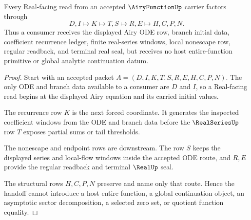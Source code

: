 \begin{theorem}
\label{thm:airy-function-real-series-handoff}
Every Real-facing read from an accepted $\AiryFunctionUp$ carrier factors through
$$
D,I \longmapsto K \longmapsto T,S \longmapsto R,E \longmapsto H,C,P,N .
$$
Thus a consumer receives the displayed Airy ODE row, branch initial data, coefficient recurrence ledger, finite real-series windows, local nonescape row, regular readback, and terminal real seal, but receives no host entire-function primitive or global analytic continuation datum.
\end{theorem}
\begin{proof}
Start with an accepted packet $A=(D,I,K,T,S,R,E,H,C,P,N)$. The only ODE and branch data available to a consumer are $D$ and $I$, so a Real-facing read begins at the displayed Airy equation and its carried initial values.

The recurrence row $K$ is the next forced coordinate. It generates the inspected coefficient windows from the ODE and branch data before the $\RealSeriesUp$ row $T$ exposes partial sums or tail thresholds.

The nonescape and endpoint rows are downstream. The row $S$ keeps the displayed series and local-flow windows inside the accepted ODE route, and $R,E$ provide the regular readback and terminal $\RealUp$ seal.

The structural rows $H,C,P,N$ preserve and name only that route. Hence the handoff cannot introduce a host entire function, a global continuation object, an asymptotic sector decomposition, a selected zero set, or quotient function equality.
\end{proof}



